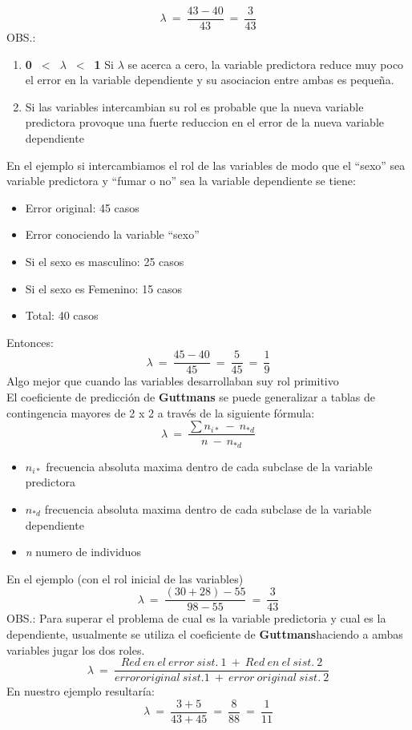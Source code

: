 \documentclass[letterpaper,spanish,11pt]{article}
\begin{document}
	$$\lambda\ =\ \frac{43-40}{43}\ =\ \frac{3}{43}$$
	OBS.:
	\begin{enumerate}
		\item \textbf{0\ $<$\ $\lambda$\ $<$\ 1} Si $\lambda$ se acerca a cero, la variable predictora reduce muy poco el error en la variable dependiente y su asociacion entre ambas es peque\~na.
		\item Si las variables intercambian su rol es probable que la nueva variable predictora provoque una fuerte reduccion en el error de la nueva variable dependiente
	\end{enumerate}
	En el ejemplo si intercambiamos el rol de las variables de modo que el ``sexo'' sea variable predictora y ``fumar o no'' sea la variable dependiente se tiene:\\
	\begin{itemize}
		\item Error original: 45 casos
		\item Error conociendo la variable ``sexo''
		\item Si el sexo es masculino: 25 casos
		\item Si el sexo es Femenino: 15 casos
		\item Total: 40 casos
	\end{itemize}
	Entonces:\\
	$$\lambda\ =\ \frac{45-40}{45}\ =\ \frac{5}{45}\ =\ \frac{1}{9}$$
	Algo mejor que cuando las variables desarrollaban suy rol primitivo\\
	El coeficiente de predicci\'on de \textbf{Guttmans} se puede generalizar a tablas de contingencia mayores de 2 x 2 a trav\'es de la siguiente f\'ormula:\\
	$$\lambda\ =\ \frac{\sum{n_{i\ast}\ -\ n_{\ast d}}}{n\ -\ n_{\ast d}}$$

	\begin{itemize}
		\item \emph{$n_{i \ast}$} frecuencia absoluta maxima dentro de cada subclase de la variable predictora
		\item \emph{$n_{\ast d}$} frecuencia absoluta maxima dentro de cada subclase de la variable dependiente
		\item \emph{n} numero de individuos
	\end{itemize}
	En el ejemplo (con el rol inicial de las variables)
	$$\lambda\ =\ \frac{(30+28)-55}{98-55}\ =\ \frac{3}{43}$$
	OBS.: Para superar el problema de cual es la variable predictoria y cual es la dependiente, usualmente se utiliza
	el coeficiente de \textbf{Guttmans}haciendo a ambas variables jugar los dos roles.
	$$\lambda\ =\ \frac{Red\ en\ el\ error\ sist.\ 1\ +\ Red\ en\ el\ sist.\ 2}{error original\ sist. 1\ +\ error\ original\ sist.\ 2}$$
	En nuestro ejemplo resultar\'ia:\\
	$$\lambda\ =\ \frac{3+5}{43+45}\ =\ \frac{8}{88}\ =\ \frac{1}{11}$$
\end{document}
